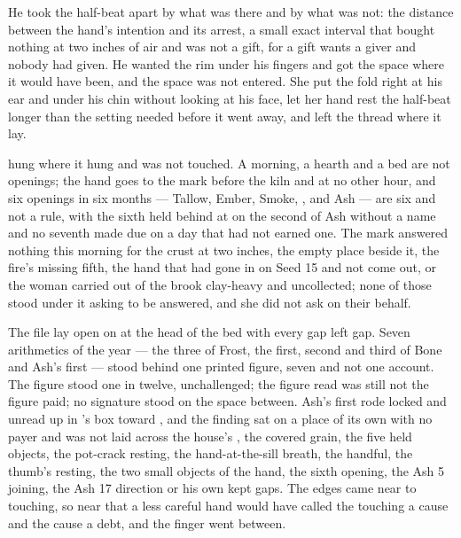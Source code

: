 He took the half-beat apart by what was there and by what was not: the distance between the hand's intention and its arrest, a small exact interval that bought nothing at two inches of air and was not a gift, for a gift wants a giver and nobody had given. He wanted the rim under his fingers and got the space where it would have been, and the space was not entered. She put the fold right at his ear and under his chin without looking at his face, let her hand rest the half-beat longer than the setting needed before it went away, and left the thread where it lay.

\scenebreak

 hung where it hung and was not touched. A morning, a hearth and a bed are not openings; the hand goes to the mark before the kiln and at no other hour, and six openings in six months --- Tallow, Ember, Smoke, ,  and Ash --- are six and not a rule, with the sixth held behind at  on the second of Ash without a name and no seventh made due on a day that had not earned one. The mark answered nothing this morning for the crust at two inches, the empty place beside it, the fire's missing fifth, the hand that had gone in on Seed 15 and not come out, or the woman carried out of the brook clay-heavy and uncollected; none of those stood under it asking to be answered, and she did not ask on their behalf.

The file lay open on  at the head of the bed with every gap left gap. Seven arithmetics of the year --- the three of Frost, the first, second and third of Bone and Ash's first --- stood behind one printed figure, seven and not one account. The figure stood one in twelve, unchallenged; the figure read was still not the figure paid; no signature stood on the space between. Ash's first rode locked and unread up  in 's box toward , and the finding sat on a place of its own with no payer and was not laid across the house's , the covered grain, the five held objects, the pot-crack resting, the hand-at-the-sill breath, the handful, the thumb's resting, the two small objects of the hand, the sixth opening, the Ash 5 joining, the Ash 17 direction or his own kept gaps. The edges came near to touching, so near that a less careful hand would have called the touching a cause and the cause a debt, and the finger went between.

